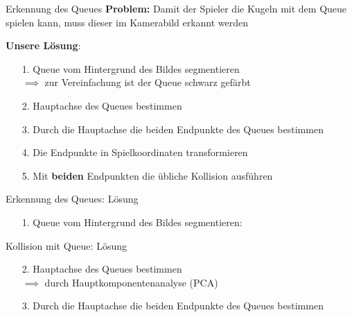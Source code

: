 \begin{frame}{Erkennung des Queues}
\textbf{Problem:} Damit der Spieler die Kugeln mit dem Queue spielen kann, muss dieser im Kamerabild erkannt werden

\pause

\textbf{Unsere Lösung}:
\begin{itemize}
	\item[1.] Queue vom Hintergrund des Bildes segmentieren\\
	\pause
	$\implies$ zur Vereinfachung ist der Queue schwarz gefärbt
	\pause
	\item[2.] Hauptachse des Queues bestimmen
	\pause
	\item[3.] Durch die Hauptachse die beiden Endpunkte des Queues bestimmen
	\pause
	\item[4.] Die Endpunkte in Spielkoordinaten transformieren
	\pause
	\item[5.] Mit \textbf{beiden} Endpunkten die übliche Kollision ausführen
	
\end{itemize}
\end{frame}

\begin{frame}{Erkennung des Queues: Lösung}
\begin{itemize}
	\item [1.] Queue vom Hintergrund des Bildes segmentieren:
\end{itemize}
\begin{center}
\end{center}
\end{frame}
\begin{frame}{Kollision mit Queue: Lösung}
\begin{itemize}
	\item [2.] Hauptachse des Queues bestimmen\\
	$\implies$ durch Hauptkomponentenanalyse (PCA)
	
	\item [3.] Durch die Hauptachse die beiden Endpunkte des Queues bestimmen
\end{itemize}
\begin{center}
\end{center}
\end{frame}

